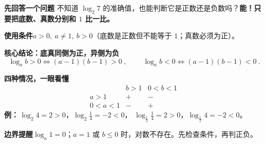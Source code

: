 \begin{statementbox}
  \textbf{\textcolor{CStatement}{先回答一个问题}}\quad
  不知道 $\log_2 7$ 的准确值，也能判断它是正数还是负数吗？\textbf{能！只要把底数、真数分别和 $1$ 比一比。}

  \medskip
  \textbf{\textcolor{CStatement}{使用条件}}\quad $a>0,\ a\neq1,\ b>0$（底数是正数但不能等于 $1$；真数必须为正）。

  \medskip
  \textbf{\textcolor{CStatement}{核心结论：底真同侧为正，异侧为负}}
  \[
    \boxed{\ \log_a b>0\iff(a-1)(b-1)>0\ },\qquad
    \boxed{\ \log_a b<0\iff(a-1)(b-1)<0\ }.
  \]
  \begin{center}
  
  \end{center}

  \textbf{\textcolor{CStatement}{四种情况，一眼看懂}}
  \[
    \begin{array}{c|cc}
      &b>1&0<b<1\\ \hline
      a>1 & + & -\\
      0<a<1 & - & +
    \end{array}
  \]
  \textbf{例：}\,$\log_2 4=2>0$，$\log_2\frac14=-2<0$，
  $\log_{\frac12}\frac14=2>0$，$\log_{\frac12}4=-2<0$。

  \textbf{\textcolor{CStatement}{边界提醒}}\quad $\log_a1=0$；$a=1$ 或 $b\leq0$ 时，对数不存在。先检查条件，再判正负。
\end{statementbox}
